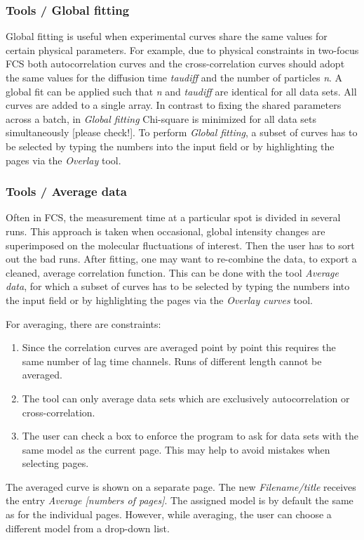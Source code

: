 \subsubsection{Tools / Global fitting}
\label{sec:tm.gf}
Global fitting is useful when experimental curves share the same values for certain physical parameters. For example, due to physical constraints in two-focus FCS both autocorrelation curves and the cross-correlation curves should adopt the same values for the diffusion time \textit{taudiff} and the number of particles \textit{n}. A global fit can be applied such that \textit{n} and \textit{taudiff} are identical for all data sets. All curves are added to a single array. In contrast to fixing the shared parameters across a batch, in \textit{Global fitting} Chi-square is minimized for all data sets simultaneously [please check!]. To perform \textit{Global fitting}, a subset of curves has to be selected by typing the numbers into the input field or by highlighting the pages via the \textit{Overlay} tool. 

\subsubsection{Tools / Average data}
\label{sec:tm.ad}
Often in FCS, the measurement time at a particular spot is divided in several runs. This approach is taken when occasional, global intensity changes are superimposed on the molecular fluctuations of interest. Then the user has to sort out the bad runs. After fitting, one may want to re-combine the data, to export a cleaned, average correlation function. This can be done with the tool \textit{Average data}, for which a subset of curves has to be selected by typing the numbers into the input field or by highlighting the pages via the \textit{Overlay curves} tool. 

For averaging, there are constraints:


\begin{enumerate}
\item Since the correlation curves are averaged point by point this requires the same number of lag time channels. Runs of different length cannot be averaged.
\item The tool can only average data sets which are exclusively autocorrelation or cross-correlation.
\item The user can check a box to enforce the program to ask for data sets with the same model as the current page. This may help to avoid mistakes when selecting pages.
\end{enumerate}
The averaged curve is shown on a separate page. The new \textit{Filename/title} receives the entry \textit{Average [numbers of pages]}. The assigned model is by default the same as for the individual pages. However, while averaging, the user can choose a different model from a drop-down list. 

